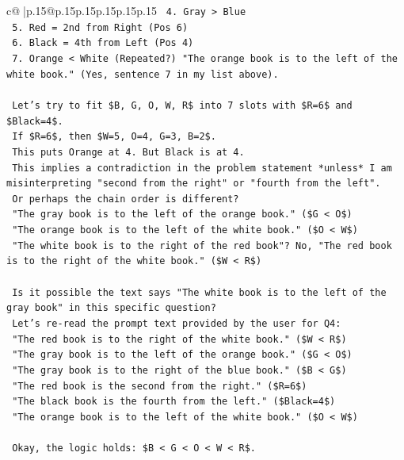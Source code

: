\documentclass{article}
\begin{document}
{\begin{supertabular}{c@{$\;$}|p{.15\linewidth}@{}p{.15\linewidth}p{.15\linewidth}p{.15\linewidth}p{.15\linewidth}p{.15\linewidth}}
{{{\texttt{    4. Gray > Blue} \\
\texttt{    5. Red = 2nd from Right (Pos 6)} \\
\texttt{    6. Black = 4th from Left (Pos 4)} \\
\texttt{    7. Orange < White (Repeated?) "The orange book is to the left of the white book." (Yes, sentence 7 in my list above).} \\
\\ 
\texttt{    Let's try to fit \$B, G, O, W, R\$ into 7 slots with \$R=6\$ and \$Black=4\$.} \\
\texttt{    If \$R=6\$, then \$W=5, O=4, G=3, B=2\$.} \\
\texttt{    This puts Orange at 4. But Black is at 4.} \\
\texttt{    This implies a contradiction in the problem statement *unless* I am misinterpreting "second from the right" or "fourth from the left".} \\
\texttt{    Or perhaps the chain order is different?} \\
\texttt{    "The gray book is to the left of the orange book." (\$G < O\$)} \\
\texttt{    "The orange book is to the left of the white book." (\$O < W\$)} \\
\texttt{    "The white book is to the right of the red book"? No, "The red book is to the right of the white book." (\$W < R\$)} \\
\\ 
\texttt{    Is it possible the text says "The white book is to the left of the gray book" in this specific question?} \\
\texttt{    Let's re{-}read the prompt text provided by the user for Q4:} \\
\texttt{    "The red book is to the right of the white book." (\$W < R\$)} \\
\texttt{    "The gray book is to the left of the orange book." (\$G < O\$)} \\
\texttt{    "The gray book is to the right of the blue book." (\$B < G\$)} \\
\texttt{    "The red book is the second from the right." (\$R=6\$)} \\
\texttt{    "The black book is the fourth from the left." (\$Black=4\$)} \\
\texttt{    "The orange book is to the left of the white book." (\$O < W\$)} \\
\\ 
\texttt{    Okay, the logic holds: \$B < G < O < W < R\$.} \\
}}}
\end{supertabular}}
\end{document}

